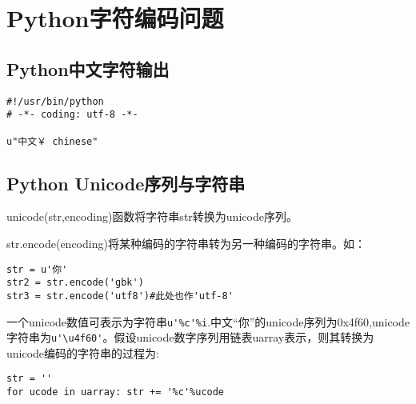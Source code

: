 
\section{Python字符编码问题}
\subsection{Python中文字符输出}
\begin{verbatim}
#!/usr/bin/python
# -*- coding: utf-8 -*-

u"中文￥ chinese"
\end{verbatim}

\subsection{Python Unicode序列与字符串}
unicode(str,encoding)函数将字符串str转换为unicode序列。

str.encode(encoding)将某种编码的字符串转为另一种编码的字符串。如：
\begin{verbatim}
str = u'你'
str2 = str.encode('gbk')
str3 = str.encode('utf8')#此处也作'utf-8'
\end{verbatim}


一个unicode数值可表示为字符串\verb|u'%c'%i|.中文“你”的unicode序列为0x4f60,unicode字符串为\verb|u'\u4f60'|。假设unicode数字序列用链表uarray表示，则其转换为unicode编码的字符串的过程为:
\begin{verbatim}
str = ''
for ucode in uarray: str += '%c'%ucode
\end{verbatim}

\label{subsec:PythonUnicode}




